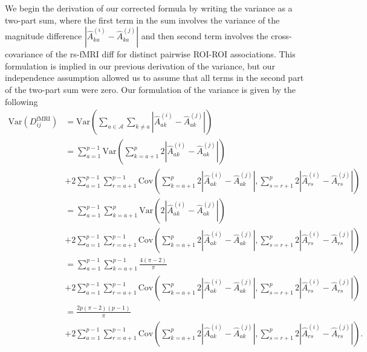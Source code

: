 \documentclass[aoas]{imsart}
\begin{document}
We begin the derivation of our corrected formula by writing the variance as a two-part sum, where the first term in the sum involves the variance of the magnitude difference $|\hat{A}^{(i)}_{ka} - \hat{A}^{(j)}_{ka}|$ and then second term involves the cross-covariance of the rs-fMRI diff for distinct pairwise ROI-ROI associations. This formulation is implied in our previous derivation of the variance, but our independence assumption allowed us to assume that all terms in the second part of the two-part sum were zero. Our formulation of the variance is given by the following
%
\begin{equation}\label{eq:var_DDistr_rs-fMRI}
\begin{aligned}
\text{Var}(D^\text{fMRI}_{ij}) &= \text{Var}\left(\sum_{a \in \mathcal{A}} \sum_{k \neq a} \left|\hat{A}^{(i)}_{ak} - \hat{A}^{(j)}_{ak}\right|\right) \\
&= \sum_{a = 1}^{p-1} \text{Var}\left(\sum_{k=a+1}^{p} 2\left|\hat{A}^{(i)}_{ak} - \hat{A}^{(j)}_{ak}\right|\right) \\
&+ 2\sum_{a = 1}^{p-1} \sum_{r=a+1}^{p-1} \text{Cov}\left(\sum_{k=a+1}^{p} 2\left|\hat{A}^{(i)}_{ak} - \hat{A}^{(j)}_{ak}\right|, \sum_{s=r+1}^{p} 2\left|\hat{A}^{(i)}_{rs} - \hat{A}^{(j)}_{rs}\right|\right) \\
&= \sum_{a=1}^{p-1} \sum_{k=a+1}^{p} \text{Var}\left(2\left|\hat{A}^{(i)}_{ak} - \hat{A}^{(j)}_{ak}\right|\right) \\
&+ 2\sum_{a = 1}^{p-1} \sum_{r=a+1}^{p-1} \text{Cov}\left(\sum_{k=a+1}^{p} 2\left|\hat{A}^{(i)}_{ak} - \hat{A}^{(j)}_{ak}\right|, \sum_{s=r+1}^{p} 2\left|\hat{A}^{(i)}_{rs} - \hat{A}^{(j)}_{rs}\right|\right) \\
&= \sum_{a = 1}^{p-1} \sum_{k=a+1}^{p-1}\frac{4(\pi-2)}{\pi} \\
&+ 2\sum_{a = 1}^{p-1} \sum_{r=a+1}^{p-1} \text{Cov}\left(\sum_{k=a+1}^{p} 2\left|\hat{A}^{(i)}_{ak} - \hat{A}^{(j)}_{ak}\right|, \sum_{s=r+1}^{p} 2\left|\hat{A}^{(i)}_{rs} - \hat{A}^{(j)}_{rs}\right|\right) \\
&= \frac{2p(\pi-2)(p-1)}{\pi} \\
&+ 2\sum_{a = 1}^{p-1} \sum_{r=a+1}^{p-1} \text{Cov}\left(\sum_{k=a+1}^{p} 2\left|\hat{A}^{(i)}_{ak} - \hat{A}^{(j)}_{ak}\right|, \sum_{s=r+1}^{p} 2\left|\hat{A}^{(i)}_{rs} - \hat{A}^{(j)}_{rs}\right|\right).
\end{aligned}
\end{equation}
\end{document}
